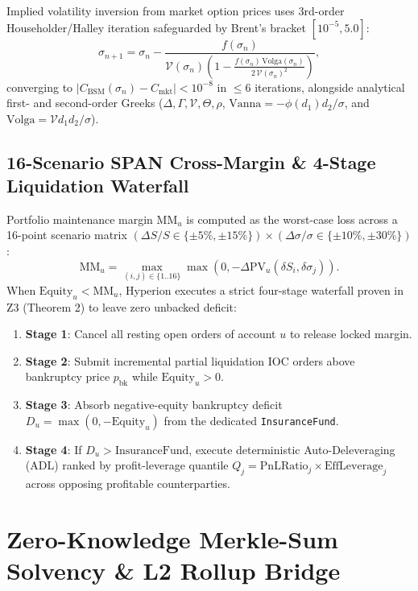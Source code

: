 \documentclass[10pt,twocolumn]{article}
\begin{document}
Implied volatility inversion from market option prices uses 3rd-order Householder/Halley iteration safeguarded by Brent's bracket $[10^{-5}, 5.0]$:
\begin{equation}
  \sigma_{n+1} = \sigma_n - \frac{f(\sigma_n)}{\mathcal{V}(\sigma_n)\left( 1 - \frac{f(\sigma_n)\,\mathrm{Volga}(\sigma_n)}{2\,\mathcal{V}(\sigma_n)^2} \right)},
\end{equation}
converging to $|C_{\text{BSM}}(\sigma_n) - C_{\text{mkt}}| < 10^{-8}$ in $\le 6$ iterations, alongside analytical first- and second-order Greeks ($\Delta, \Gamma, \mathcal{V}, \Theta, \rho$, $\mathrm{Vanna} = -\phi(d_1)d_2/\sigma$, and $\mathrm{Volga} = \mathcal{V} d_1 d_2 / \sigma$).

\subsection{16-Scenario SPAN Cross-Margin \& 4-Stage Liquidation Waterfall}
Portfolio maintenance margin $\mathrm{MM}_u$ is computed as the worst-case loss across a 16-point scenario matrix $(\Delta S / S \in \{\pm 5\%, \pm 15\%\}) \times (\Delta \sigma / \sigma \in \{\pm 10\%, \pm 30\%\})$:
\begin{equation}
  \mathrm{MM}_u = \max_{(i,j) \in \{1..16\}} \max\!\left(0, -\Delta \mathrm{PV}_u(\delta S_i, \delta \sigma_j)\right).
\end{equation}
When $\mathrm{Equity}_u < \mathrm{MM}_u$, Hyperion executes a strict four-stage waterfall proven in Z3 (Theorem 2) to leave zero unbacked deficit:
\begin{enumerate}
  \item \textbf{Stage 1}: Cancel all resting open orders of account $u$ to release locked margin.
  \item \textbf{Stage 2}: Submit incremental partial liquidation IOC orders above bankruptcy price $p_{\text{bk}}$ while $\mathrm{Equity}_u > 0$.
  \item \textbf{Stage 3}: Absorb negative-equity bankruptcy deficit $D_u = \max(0, -\mathrm{Equity}_u)$ from the dedicated \texttt{InsuranceFund}.
  \item \textbf{Stage 4}: If $D_u > \mathrm{InsuranceFund}$, execute deterministic Auto-Deleveraging (ADL) ranked by profit-leverage quantile $Q_j = \mathrm{PnLRatio}_j \times \mathrm{EffLeverage}_j$ across opposing profitable counterparties.
\end{enumerate}

\section{Zero-Knowledge Merkle-Sum Solvency \& L2 Rollup Bridge}
\end{document}
